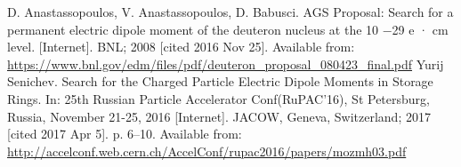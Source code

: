 \documentclass{article}
\begin{document}
\begin{thebibliography}{99}
  D. Anastassopoulos, V. Anastassopoulos, D. Babusci. AGS Proposal: Search for a permanent electric dipole moment of the deuteron nucleus at the 10 −29 e · cm level. [Internet]. BNL; 2008 [cited 2016 Nov 25]. Available from: \url{https://www.bnl.gov/edm/files/pdf/deuteron_proposal_080423_final.pdf}
  Yurij Senichev. Search for the Charged Particle Electric Dipole Moments in Storage Rings. In: 25th Russian Particle Accelerator Conf(RuPAC’16), St Petersburg, Russia, November 21-25, 2016 [Internet]. JACOW, Geneva, Switzerland; 2017 [cited 2017 Apr 5]. p. 6–10. Available from: \url{http://accelconf.web.cern.ch/AccelConf/rupac2016/papers/mozmh03.pdf}

\end{thebibliography}
\end{document}

